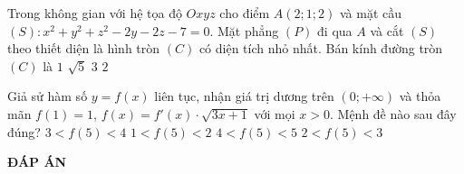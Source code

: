 \begin{ex}%
	Trong không gian với hệ tọa độ $Oxyz$ cho điểm $A(2;1;2)$ và mặt cầu  $(S): x^2 + y^2 + z^2 - 2y - 2z - 7 = 0$. Mặt phẳng $(P)$ đi qua $A$ và cắt $(S)$ theo thiết diện là hình tròn $(C)$ có diện tích nhỏ nhất. Bán kính đường tròn $(C)$ là
	\choice
	{$1$}
	{$\sqrt{5}$}
	{$3$}
	{\True $2$}
\end{ex}

\begin{ex}%
	Giả sử hàm số $y = f(x)$ liên tục, nhận giá trị dương trên $(0;+\infty)$ và thỏa mãn $f(1) = 1$, $f(x) = f'(x) \cdot \sqrt{3x + 1}$ với mọi $x > 0$. Mệnh đề nào sau đây đúng?	
	\choice
	{\True $3 < f(5) < 4$}
	{$1 < f(5) < 2$}
	{$4 < f(5) < 5$}
	{$2 < f(5) < 3$}
\end{ex}
\newpage
\begin{center}
	\textbf{ĐÁP ÁN}
\end{center}
\begin{multicols}{10}
	 
\end{multicols}

